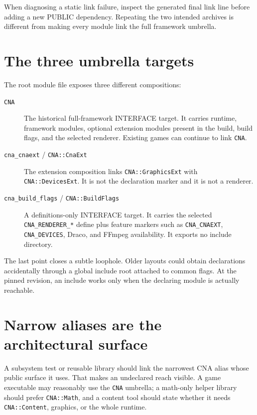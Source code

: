 When diagnosing a static link failure, inspect the generated final link line before adding a new
PUBLIC dependency.  Repeating the two intended archives is different from making every module link
the full framework umbrella.

\section{The three umbrella targets}

The root module file exposes three different compositions:

\begin{description}
  \item[\texttt{CNA}] The historical full-framework INTERFACE target.  It carries runtime,
        framework modules, optional extension modules present in the build, build flags, and the
        selected renderer.  Existing games can continue to link \texttt{CNA}.
  \item[\texttt{cna\_cnaext} / \texttt{CNA::CnaExt}] \mbox{}\par
        The extension composition links \texttt{CNA::GraphicsExt} with
        \texttt{CNA::DevicesExt}.  It is not the declaration marker
        and it is not a renderer.
  \item[\texttt{cna\_build\_flags} / \texttt{CNA::BuildFlags}] A definitions-only INTERFACE
        target.  It carries the selected \texttt{CNA\_RENDERER\_*} define plus feature markers such
        as \texttt{CNA\_CNAEXT}, \texttt{CNA\_DEVICES}, Draco, and FFmpeg availability.  It exports
        no include directory.
\end{description}

The last point closes a subtle loophole.  Older layouts could obtain declarations accidentally
through a global include root attached to common flags.  At the pinned revision, an include works
only when the declaring module is actually reachable.

\section{Narrow aliases are the architectural surface}

A subsystem test or reusable library should link the narrowest CNA alias whose public surface it
uses.  That makes an undeclared reach visible.  A game executable may reasonably use the
\texttt{CNA} umbrella; a math-only helper library should prefer \texttt{CNA::Math}, and a content
tool should state whether it needs \texttt{CNA::Content}, graphics, or the whole runtime.

